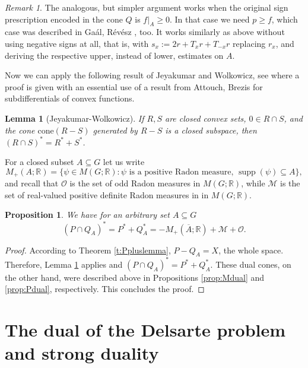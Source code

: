 \documentclass[[a4paper,english,12pt]{amsart}
\theoremstyle{plain}
\newtheorem{lemma}[theorem]{Lemma}
\newtheorem{proposition}[theorem]{Proposition}
\theoremstyle{remark}
\newtheorem{remark}[theorem]{Remark}
\newcommand\supp{\operatorname{supp}}
\newcommand{\MM}{\mathcal{M}}
\newcommand{\OO}{\mathcal{O}}
\newcommand{\RR}{\mathbb R}
\newcommand{\oA}{\overline{A}}
\def\cone{\mathrm{cone}}
\begin{document}
\begin{remark} The analogous, but simpler argument works when the original sign prescription encoded in the cone $Q$ is $f|_A\ge 0$. In that case we need $p\ge f$, which case was described in Ga\'al, R\'ev\'esz \cite{Zeitschrift}, too. It works similarly as above without using negative signs at all, that is, with $s_x:= 2r + T_x r + T_{-x} r $ replacing $r_x$, and deriving the respective upper, instead of lower, estimates on $A$.
\end{remark}

Now we can apply the following result of Jeyakumar and Wolkowicz, see  \cite[Lemma 2.2 (a)]{JeyaWolf} where a proof is given with an essential use of a result from Attouch, Brezis \cite{Brezis} for subdifferentials of convex functions.

\begin{lemma}[Jeyakumar-Wolkowicz]\label{l:Jeya_Wolk} If $R, S$ are closed convex sets, $0 \in R \cap S$, and the cone $\cone(R-S)$ generated by $R-S$ is a closed subspace, then $(R \cap S)^*=R^* + S^*$.
\end{lemma}
 For a closed subset $A\subseteq G$ let us write
\[
M_{+}(A;\RR)=\{\psi\in M(G;\RR):\psi \text{ is a positive Radon measure, $\supp(\psi)\subseteq A$}\},
\]
and recall that $\OO$ is the set of odd Radon measures in $M(G;\RR)$, while $\MM$ is the set of real-valued positive definite Radon measures in in $M(G;\RR)$.
\begin{proposition}\label{prop:coop}
	We have for an arbitrary set $A \subseteq  G$
	\[
	(P\cap Q_A)^*=P^*+Q_A^*  = - M_{+}(\oA;\RR) + \MM +\OO.
	\]
\end{proposition}
\begin{proof} According to Theorem \ref{t:Ppluslemma}, $P-Q_A= X$, the whole space. Therefore, Lemma \ref{l:Jeya_Wolk} applies and $(P \cap Q_A)^*= P^*+Q_A^*$. These dual cones, on the other hand, were described above in Propositions \ref{prop:Mdual} and \ref{prop:Pdual}, respectively. This concludes the proof.
\end{proof}

\section{The dual of the Delsarte problem and strong duality}
\label{sec:main}
\end{document}

